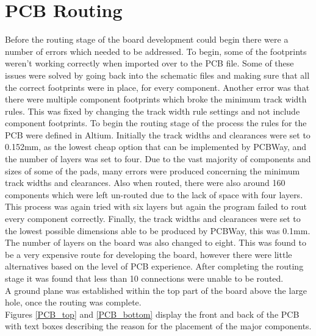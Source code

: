 
\section{PCB Routing}
\label{chap6sec6}

	Before the routing stage of the board development could begin there were a number of errors which needed to be addressed. 
To begin, some of the footprints weren't working correctly when imported over to the PCB file. 
Some of these issues were solved by going back into the schematic files and making sure that all the correct footprints were in place, for every component. 
Another error was that there were multiple component footprints which broke the minimum track width rules. 
This was fixed by changing the track width rule settings and not include component footprints.
	To begin the routing stage of the process the rules for the PCB were defined in Altium. 
Initially the track widths and clearances were set to 0.152mm, as the lowest cheap option that can be implemented by PCBWay, and the number of layers was set to four. 
Due to the vast majority of components and sizes of some of the pads, many errors were produced concerning the minimum track widths and clearances. 
Also when routed, there were also around 160 components which were left un-routed due to the lack of space with four layers. 
This process was again tried with six layers but again the program failed to rout every component correctly. 
Finally, the track widths and clearances were set to the lowest possible dimensions able to be produced by PCBWay, this was 0.1mm. 
The number of layers on the board was also changed to eight. 
This was found to be a very expensive route for developing the board, however there were little alternatives based on the level of PCB experience. 
After completing the routing stage it was found that less than 10 connections were unable to be routed.\\
A ground plane was established within the top part of the board above the large hole, once the routing was complete. \\
Figures \ref{PCB_top} and \ref{PCB_bottom} display the front and back of the PCB with text boxes describing the reason for the placement of the major components. 

